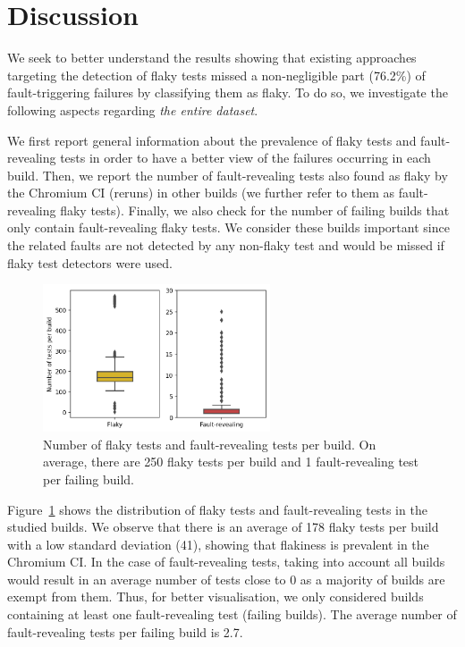 \section{Discussion}
\label{sec:chromium-discussion}

We seek to better understand the results showing that existing approaches targeting the detection of flaky tests missed a non-negligible part (76.2\%) of fault-triggering failures by classifying them as flaky. To do so, we investigate the following aspects regarding \textit{the entire dataset}.

We first report general information about the prevalence of flaky tests and fault-revealing tests in order to have a better view of the failures occurring in each build. Then, we report the number of fault-revealing tests also found as flaky by the Chromium CI (reruns) in other builds (we further refer to them as fault-revealing flaky tests). Finally, we also check for the number of failing builds that only contain fault-revealing flaky tests. We consider these builds important since the related faults are not detected by any non-flaky test and would be missed if flaky test detectors were used.

\begin{figure}[ht]
\centering
\includegraphics[width=0.6\textwidth]{figures/chromium/testsPerBuild.png}
\caption{Number of flaky tests and fault-revealing tests per build. On average, there are 250 flaky tests per build and 1 fault-revealing test per failing build.}
\label{fig:testsPerBuild}
\end{figure}

Figure~\ref{fig:testsPerBuild} shows the distribution of flaky tests and fault-revealing tests in the studied builds. We observe that there is an average of 178 flaky tests per build with a low standard deviation (41), showing that flakiness is prevalent in the Chromium CI. In the case of fault-revealing tests, taking into account all builds would result in an average number of tests close to 0 as a majority of builds are exempt from them. Thus, for better visualisation, we only considered builds containing at least one fault-revealing test (\ie failing builds). The average number of fault-revealing tests per failing build is 2.7.

